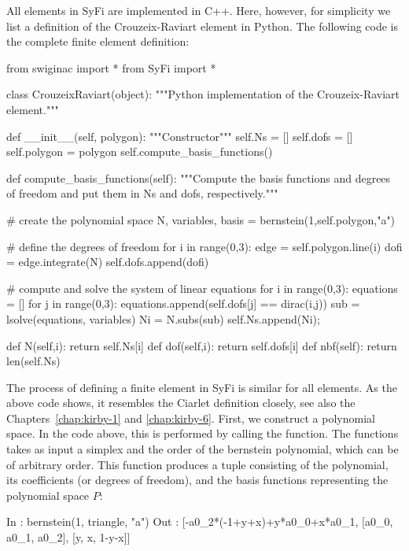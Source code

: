 All elements in SyFi are implemented in C++. Here, however, for
simplicity we list a definition of the Crouzeix-Raviart element in Python.
The following code is the complete finite element definition:
\begin{python}
from swiginac import *
from SyFi import *

class CrouzeixRaviart(object):
    """Python implementation of the Crouzeix-Raviart element."""

    def __init__(self, polygon):
        """Constructor"""
        self.Ns = []
        self.dofs = []
        self.polygon = polygon
        self.compute_basis_functions()

    def compute_basis_functions(self):
        """Compute the basis functions and degrees of freedom
        and put them in Ns and dofs, respectively."""

        # create the polynomial space
        N, variables, basis = bernstein(1,self.polygon,"a")

        # define the degrees of freedom
        for i in range(0,3):
            edge = self.polygon.line(i)
            dofi = edge.integrate(N)
            self.dofs.append(dofi)

        # compute and solve the system of linear equations
        for i in range(0,3):
            equations = []
                for j in range(0,3):
                    equations.append(self.dofs[j] == dirac(i,j))
                    sub = lsolve(equations, variables)
                    Ni = N.subs(sub)
                    self.Ns.append(Ni);

    def N(self,i): return self.Ns[i]
    def dof(self,i): return self.dofs[i]
    def nbf(self): return len(self.Ns)
\end{python}
The process of defining a finite element in SyFi is similar for all
elements.  As the above code shows, it resembles the Ciarlet definition
closely, see also the Chapters~\ref{chap:kirby-1} and \ref{chap:kirby-6}.
First, we construct a polynomial space. In the code above, this is
performed by calling the  function. The 
functions takes as input a simplex and the order of the bernstein
polynomial, which can be of arbitrary order. This function produces
a tuple consisting of the polynomial, its coefficients (or degrees of
freedom), and the basis functions representing the polynomial space $P$:
\begin{python}
In  : bernstein(1, triangle, "a")
Out : [-a0_2*(-1+y+x)+y*a0_0+x*a0_1, [a0_0, a0_1, a0_2], [y, x, 1-y-x]]
\end{python}
